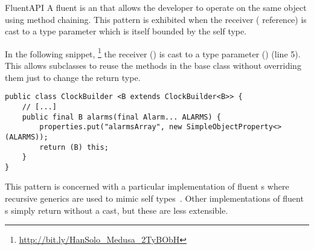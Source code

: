 \begin{pattern}{FluentAPI}
A fluent \api{} is an \api{} that allows the developer to operate on the same
object using method chaining.
This pattern is exhibited when the receiver ( reference) is cast to a type parameter
  which is itself bounded by the self type.


\instances{}
In the following snippet,%
\footnote{\url{http://bit.ly/HanSolo_Medusa_2TyBObH}}
the receiver () is cast to a type parameter () (line 5).
This allows subclasses to reuse the methods in the base class without overriding them just to change the return type.

\begin{verbatim}
public class ClockBuilder <B extends ClockBuilder<B>> {
    // [...]
    public final B alarms(final Alarm... ALARMS) {
        properties.put("alarmsArray", new SimpleObjectProperty<>(ALARMS));
        return (B) this;
    }
}
\end{verbatim}

\discussion{}
  This pattern is concerned with a particular implementation of fluent \api{}s
  where recursive generics are used to mimic self
  types~\cite{bruceChallengingTypingIssues2003}.
  Other implementations of fluent \api{}s simply return  without a
  cast, but these are less extensible.

\end{pattern}
